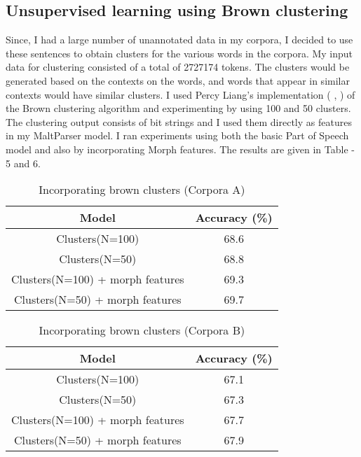 \documentclass[11pt,letterpaper]{article}
\begin{document}
\subsection{Unsupervised learning using Brown clustering}

Since, I had a large number of unannotated data in my corpora, I decided to use these sentences to obtain clusters for the various words in the corpora.
My input data for clustering consisted of a total of 2727174 tokens. The clusters would be generated based on the contexts on the words, and words that appear in similar contexts would have similar clusters. I used 
Percy Liang's implementation (\cite{liang2005semi} , \cite{brown1992class}) of the Brown clustering algorithm and experimenting by using 100 and 50 clusters. The clustering output consists of bit strings and I used them
directly as features in my MaltParser model. I ran experiments using both the basic Part of Speech model and also by incorporating Morph features. The results are given in Table - 5 and 6. \\

\begin{table}
\begin{center}
  \begin{tabular}{ c ||  c}
  \hline
   Model & Accuracy (\%)\\
  \hline
  Clusters(N=100) & 68.6 \\
  Clusters(N=50) & 68.8 \\
  Clusters(N=100) + morph features & 69.3 \\
  Clusters(N=50) + morph features & 69.7 \\
  \hline
   \end{tabular}
\end{center}
\caption{Incorporating brown clusters (Corpora A)}
\label{First}
\end{table}

\begin{table}
\begin{center}
  \begin{tabular}{ c ||  c}
  \hline
   Model & Accuracy (\%)\\
  \hline
  Clusters(N=100) & 67.1 \\
  Clusters(N=50) & 67.3 \\
  Clusters(N=100) + morph features & 67.7 \\
  Clusters(N=50) + morph features & 67.9 \\
  \hline
   \end{tabular}
\end{center}
\caption{Incorporating brown clusters (Corpora B)}
\label{First}
\end{table}
\end{document}

